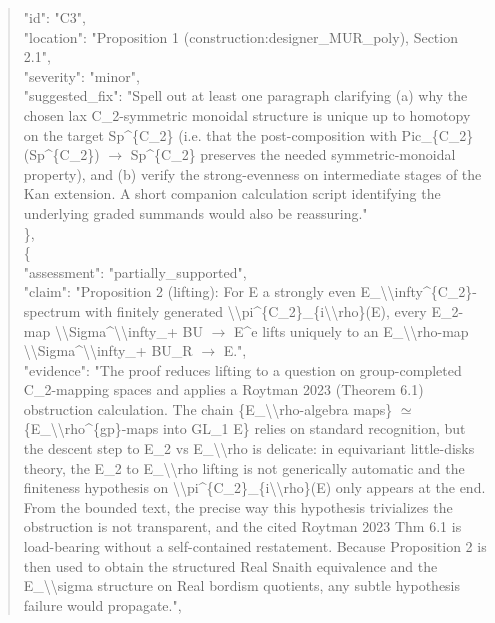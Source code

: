 \documentclass[11pt]{article}
\begin{document}
\begin{quote}
      "id": "C3",\\
      "location": "Proposition 1 (construction:designer\_MUR\_poly), Section 2.1",\\
      "severity": "minor",\\
      "suggested\_fix": "Spell out at least one paragraph clarifying (a) why the chosen lax C\_2-symmetric monoidal structure is unique up to homotopy on the target Sp\^{}\{C\_2\} (i.e. that the post-composition with Pic\_\{C\_2\}(Sp\^{}\{C\_2\}) \ensuremath{\to} Sp\^{}\{C\_2\} preserves the needed symmetric-monoidal property), and (b) verify the strong-evenness on intermediate stages of the Kan extension. A short companion calculation script identifying the underlying graded summands would also be reassuring."\\
    \},\\
    \{\\
      "assessment": "partially\_supported",\\
      "claim": "Proposition 2 (lifting): For E a strongly even E\_\textbackslash{}\textbackslash{}infty\^{}\{C\_2\}-spectrum with finitely generated \textbackslash{}\textbackslash{}pi\^{}\{C\_2\}\_\{i\textbackslash{}\textbackslash{}rho\}(E), every E\_2-map \textbackslash{}\textbackslash{}Sigma\^{}\textbackslash{}\textbackslash{}infty\_+ BU \ensuremath{\to} E\^{}e lifts uniquely to an E\_\textbackslash{}\textbackslash{}rho-map \textbackslash{}\textbackslash{}Sigma\^{}\textbackslash{}\textbackslash{}infty\_+ BU\_R \ensuremath{\to} E.",\\
      "evidence": "The proof reduces lifting to a question on group-completed C\_2-mapping spaces and applies a Roytman 2023 (Theorem 6.1) obstruction calculation. The chain \{E\_\textbackslash{}\textbackslash{}rho-algebra maps\} \ensuremath{\simeq} \{E\_\textbackslash{}\textbackslash{}rho\^{}\{gp\}-maps into GL\_1 E\} relies on standard recognition, but the descent step to E\_2 vs E\_\textbackslash{}\textbackslash{}rho is delicate: in equivariant little-disks theory, the E\_2 to E\_\textbackslash{}\textbackslash{}rho lifting is not generically automatic and the finiteness hypothesis on \textbackslash{}\textbackslash{}pi\^{}\{C\_2\}\_\{i\textbackslash{}\textbackslash{}rho\}(E) only appears at the end. From the bounded text, the precise way this hypothesis trivializes the obstruction is not transparent, and the cited Roytman 2023 Thm 6.1 is load-bearing without a self-contained restatement. Because Proposition 2 is then used to obtain the structured Real Snaith equivalence and the E\_\textbackslash{}\textbackslash{}sigma structure on Real bordism quotients, any subtle hypothesis failure would propagate.",\\

\end{quote}
\end{document}
